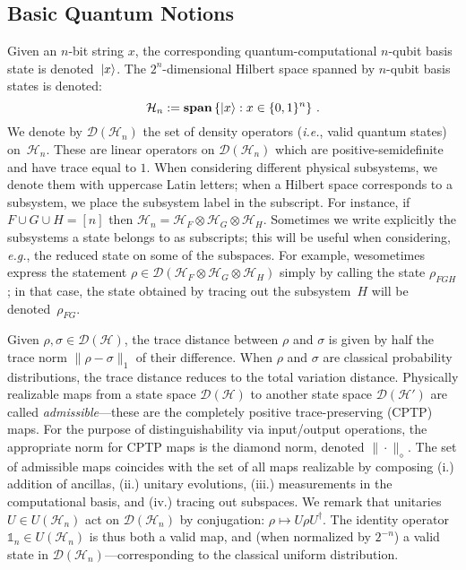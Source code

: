 \subsection{Basic Quantum Notions}
\label{sec:quantum-prelims}
\cite{CH05} 
Given an $n$-bit string $x$, the corresponding quantum-computational $n$-qubit basis state is denoted~${\lvert}x\rangle$. The $2^n$-dimensional Hilbert space spanned by $n$-qubit basis states is denoted:
\begin{equation}
\mathcal{H}_n := \textbf{span} \left\{ {\lvert}x\rangle : x \in \{0,1\}^{n} \right\}\,.
\end{equation}
We denote by $\mathcal{D}(\mathcal{H}_n)$ the set of density operators (\emph{i.e.}, valid quantum states) on~$\mathcal{H}_n$. These are linear operators on $\mathcal{D}(\mathcal{H}_n)$ which are positive-semidefinite and have trace equal to $1$. When considering different physical subsystems, we denote them with uppercase Latin letters; when a Hilbert space corresponds to a subsystem, we place the subsystem label in the subscript. For instance, if $F \cup G \cup H = [n]$ then $\mathcal{H}_n = \mathcal{H}_F \otimes \mathcal{H}_G \otimes \mathcal{H}_H.$ Sometimes we  write explicitly the subsystems a state belongs to as subscripts; this will be useful when considering, \emph{e.g.}, the reduced state on some of the subspaces. For example, wesometimes express the statement $\rho \in \mathcal{D}(\mathcal{H}_F \otimes \mathcal{H}_G \otimes \mathcal{H}_H)$ simply by calling the state $\rho_{FGH}$; in that case, the state obtained by tracing out the subsystem~$H$ will be denoted~$\rho_{FG}$.


Given $\rho, \sigma \in \mathcal{D}(\mathcal{H})$, the trace distance between $\rho$ and $\sigma$ is given by half the trace norm $\|\rho - \sigma\|_1$ of their difference. When $\rho$ and $\sigma$ are classical probability distributions, the trace distance reduces to the total variation distance. Physically realizable maps from a state space $\mathcal{D}(\mathcal{H})$ to another state space $\mathcal{D}(\mathcal{H}')$ are called \emph{admissible}---these are the completely positive trace-preserving (CPTP) maps. For the purpose of distinguishability via input/output operations, the appropriate norm for CPTP maps is the diamond norm, denoted $\|\cdot\|_\diamond$. The set of admissible maps coincides with the set of all maps realizable by composing (i.) addition of ancillas, (ii.) unitary evolutions, (iii.) measurements in the computational basis, and (iv.) tracing out subspaces. We remark that unitaries $U \in U(\mathcal{H}_n)$ act on $\mathcal{D}(\mathcal{H}_n)$ by conjugation: $\rho \mapsto U \rho U^\dagger$. The identity operator~$\mathds{1}_n \in U(\mathcal{H}_n)$ is thus both a valid map, and (when normalized by $2^{-n}$) a valid state in $\mathcal{D}(\mathcal{H}_n)$---corresponding to the classical uniform distribution.


